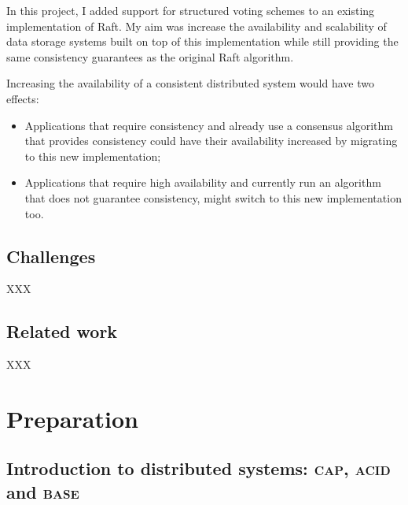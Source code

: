 \documentclass[11pt,chapterprefix=true,toc=bibliography,numbers=noendperiod,
               footnotes=multiple,twoside]{scrreprt}
\begin{document}
In this project, I added support for structured voting schemes to an existing implementation of Raft. My aim was increase the availability and scalability of data storage systems built on top of this implementation while still providing the same consistency guarantees as the original Raft algorithm.

Increasing the availability of a consistent distributed system would have two effects:

\begin{itemize}
    \item Applications that require consistency and already use a consensus algorithm that provides consistency could have their availability increased by migrating to this new implementation;
    \item Applications that require high availability and currently run an algorithm that does not guarantee consistency, might switch to this new implementation too.
\end{itemize}

\section{Challenges\label{sc:challenges}}

XXX

\section{Related work\label{sc:related-work}}

XXX

\chapter{Preparation\label{ch:preparation}}


\section[Introduction to distributed systems]{Introduction to distributed systems: \textsc{cap}, \textsc{acid} and \textsc{base}\label{ssc:cap-acid-and-base}}
\end{document}
